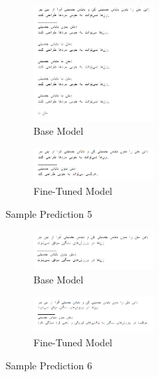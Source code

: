 \documentclass{solutionclass} %
\begin{document}
\begin{figure}[ht!]
	\centering
\begin{subfigure}[t]{0.5\textwidth}
	\centering
	\includegraphics[width=0.5\textwidth]{img/3/s5b.png}
	\caption{Base Model}
\end{subfigure}%

\bigskip

\begin{subfigure}[t]{0.5\textwidth}
	\centering
	\includegraphics[width=0.5\textwidth]{img/3/s5f.png}
	\caption{Fine-Tuned Model}
\end{subfigure}
	\caption{Sample Prediction 5}
\end{figure}





\begin{figure}[ht!]
	\centering
\begin{subfigure}[t]{0.5\textwidth}
	\centering
	\includegraphics[width=0.5\textwidth]{img/3/s6b.png}
	\caption{Base Model}
\end{subfigure}%

\bigskip

\begin{subfigure}[t]{\textwidth}
	\centering
	\includegraphics[width=0.5\textwidth]{img/3/s6f.png}
	\caption{Fine-Tuned Model}
\end{subfigure}
	\caption{Sample Prediction 6}
\end{figure}
\end{document}
